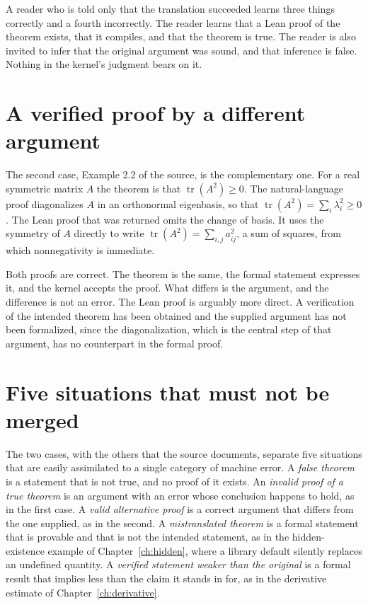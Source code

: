 A reader who is told only that the translation succeeded learns three things correctly and a fourth incorrectly. The reader learns that a Lean proof of the theorem exists, that it compiles, and that the theorem is true. The reader is also invited to infer that the original argument was sound, and that inference is false. Nothing in the kernel's judgment bears on it.

\section{A verified proof by a different argument}

The second case, Example 2.2 of the source, is the complementary one. For a real symmetric matrix $A$ the theorem is that $\operatorname{tr}(A^2) \ge 0$. The natural-language proof diagonalizes $A$ in an orthonormal eigenbasis, so that $\operatorname{tr}(A^2) = \sum_i \lambda_i^2 \ge 0$. The Lean proof that was returned omits the change of basis. It uses the symmetry of $A$ directly to write $\operatorname{tr}(A^2) = \sum_{i,j} a_{ij}^2$, a sum of squares, from which nonnegativity is immediate.

Both proofs are correct. The theorem is the same, the formal statement expresses it, and the kernel accepts the proof. What differs is the argument, and the difference is not an error. The Lean proof is arguably more direct. A verification of the intended theorem has been obtained and the supplied argument has not been formalized, since the diagonalization, which is the central step of that argument, has no counterpart in the formal proof.

\section{Five situations that must not be merged}

The two cases, with the others that the source documents, separate five situations that are easily assimilated to a single category of machine error. A \emph{false theorem} is a statement that is not true, and no proof of it exists. An \emph{invalid proof of a true theorem} is an argument with an error whose conclusion happens to hold, as in the first case. A \emph{valid alternative proof} is a correct argument that differs from the one supplied, as in the second. A \emph{mistranslated theorem} is a formal statement that is provable and that is not the intended statement, as in the hidden-existence example of Chapter~\ref{ch:hidden}, where a library default silently replaces an undefined quantity. A \emph{verified statement weaker than the original} is a formal result that implies less than the claim it stands in for, as in the derivative estimate of Chapter~\ref{ch:derivative}.

